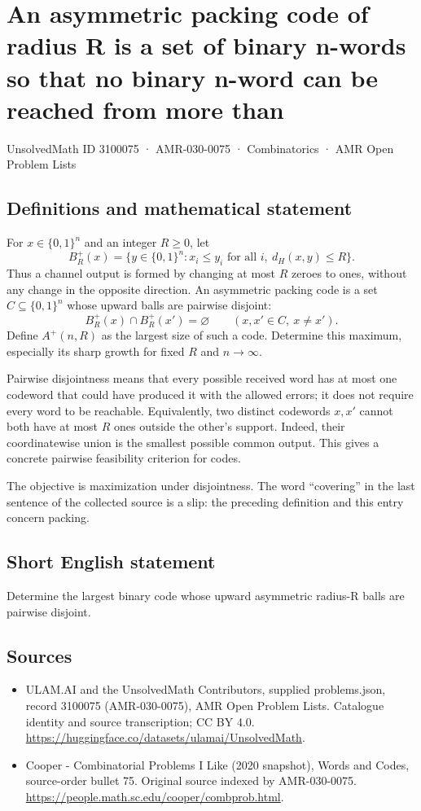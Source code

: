 \documentclass[11pt,a4paper]{article}
\begin{document}
\section*{An asymmetric packing code of radius R is a set of binary n-words so that no binary n-word can be reached from more than}\label{3100075}
{\small UnsolvedMath ID 3100075 · AMR-030-0075 · Combinatorics · AMR Open Problem Lists}
\subsection{Definitions and mathematical statement}
For $x\in\{0,1\}^n$ and an integer $R\ge0$, let
\[
 B_R^+(x)=\{y\in\{0,1\}^n:x_i\le y_i\text{ for all }i,
                              \ d_H(x,y)\le R\}.
\]
Thus a channel output is formed by changing at most $R$ zeroes
to ones, without any change in the opposite direction.
An asymmetric packing code is a set $C\subseteq\{0,1\}^n$ whose
upward balls are pairwise disjoint:
\[
             B_R^+(x)\cap B_R^+(x')=\varnothing
                       \qquad(x,x'\in C,\ x\ne x').
\]
Define $A^+(n,R)$ as the largest size of such a code.
Determine this maximum, especially its sharp growth for fixed
$R$ and $n\to\infty$.

Pairwise disjointness means that every possible received word
has at most one codeword that could have produced it with the
allowed errors; it does not require every word to be reachable.
Equivalently, two distinct codewords $x,x'$ cannot both have at
most $R$ ones outside the other's support. Indeed, their
coordinatewise union is the smallest possible common output.
This gives a concrete pairwise feasibility criterion for codes.

The objective is maximization under disjointness. The word
``covering'' in the last sentence of the collected source is a
slip: the preceding definition and this entry concern packing.
\subsection{Short English statement}
Determine the largest binary code whose upward asymmetric radius-R balls are pairwise disjoint.
\subsection{Sources}
\begin{itemize}
\item[S1] ULAM.AI and the UnsolvedMath Contributors, supplied problems.json, record 3100075 (AMR-030-0075), AMR Open Problem Lists. Catalogue identity and source transcription; CC BY 4.0.
\url{https://huggingface.co/datasets/ulamai/UnsolvedMath}.
\item[S2] Cooper - Combinatorial Problems I Like (2020 snapshot), Words and Codes, source-order bullet 75. Original source indexed by AMR-030-0075.
\url{https://people.math.sc.edu/cooper/combprob.html}.
\end{itemize}
\end{document}
